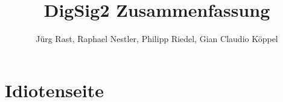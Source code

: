 \documentclass{scrartcl}
\title{DigSig2 Zusammenfassung}
\author{Jürg Rast, Raphael Nestler, Philipp Riedel, Gian Claudio Köppel}
\begin{document}
\maketitle
\newpage

\tableofcontents
\newpage








\section{Idiotenseite}



\begin{multicols}{2}






\end{multicols}

\end{document}
